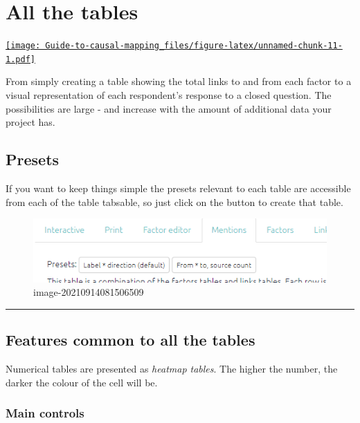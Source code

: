 \documentclass[
]{book}
\begin{document}
\hypertarget{xall-tables-old}{%
\chapter{All the tables}\label{xall-tables-old}}

\href{https://player.vimeo.com/video/596519456}{\texttt{[image: Guide-to-causal-mapping\_files/figure-latex/unnamed-chunk-11-1.pdf]}}

From simply creating a table showing the total links to and from each factor to a visual representation of each respondent's response to a closed question. The possibilities are large - and increase with the amount of additional data your project has.

\hypertarget{preset-tables-old}{%
\section{Presets}\label{preset-tables-old}}

If you want to keep things simple the presets relevant to each table are accessible from each of the table tabsable, so just click on the button to create that table.

\begin{figure}
\centering
\includegraphics[width=6.77083in,height=\textheight]{_assets/image-20210914081506509.png}
\caption{image-20210914081506509}
\end{figure}

\begin{center}\rule{0.5\linewidth}{0.5pt}\end{center}

\hypertarget{tables_common-old}{%
\section{Features common to all the tables}\label{tables_common-old}}

Numerical tables are presented as \emph{heatmap tables}. The higher the number, the darker the colour of the cell will be.

\hypertarget{main-controls}{%
\subsection{Main controls}\label{main-controls}}
\end{document}
